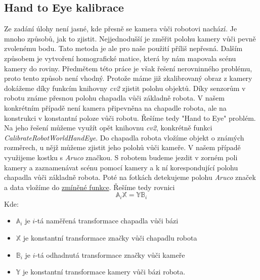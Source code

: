 \documentclass[journal,twoside,web]{ieeecolor}
\begin{document}
\subsection{Hand to Eye kalibrace}
Ze zadání úlohy není jasné, kde přesně se kamera vůči robotovi nachází. Je mnoho způsobů, jak to zjistit.  %
Nejjednodušší je změřit polohu kamery vůči pevně zvolenému bodu. Tato metoda je ale pro naše použití
příliš nepřesná. Dalším způsobem je vytvoření homografické matice, která by nám mapovala scénu kamery
do roviny. Předmětem této práce je však řešení nerovninného problému, proto tento způsob není vhodný.
Protože máme již zkalibrovaný obraz z kamery dokážeme díky funkcím knihovny \textit{cv2} zjistit polohu
objektů. Díky senzorům v robotu známe přesnou polohu chapadla vůči základně robota. V našem konkrétním případě
není kamera připevněna na chapadle robota, ale na konstrukci v konstantní poloze vůči robotu. %
Řešíme tedy "Hand to Eye" problém. Na jeho řešení můžeme využít opět knihovnu \textit{cv2}, konkrétně
funkci \hypertarget{cv2Handeye}{\textit{CalibrateRobotWorldHandEye}}. Do chapadla robota vložíme objekt o známých rozměrech,
u nějž můžeme zjistit jeho polohů vůči kameře. V našem případě využijeme kostku s \textit{Aruco} značkou.
S robotem budeme jezdit v zorném poli kamery a zaznamenávat scénu pomocí kamery a k ní korespondující
polohu chapadla vůči základně robota. Poté na fotkách detekujeme polohu \textit{Aruco} značek a data vložíme
do \hyperlink{cv2Handeye}{zmíněné funkce}. Řešíme tedy rovnici
\begin{equation}
    \mathbb{A}_i \mathbb{X} = \mathbb{Y}\mathbb{B}_i
\end{equation}
Kde:
\begin{itemize}
    \item $\mathbb{A}_i$ je $i$-tá naměřená transformace chapadla vůči bázi\\
    \item $\mathbb{X}$ je konstantní transformace značky vůči chapadlu robota\\
    \item $\mathbb{B}_i$ je $i$-tá odhadnutá transformace značky vůči kameře\\
    \item $\mathbb{Y}$ je konstantní transformace kamery vůči bázi robota.
\end{itemize}
\end{document}
